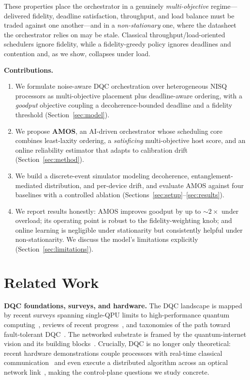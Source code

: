 \documentclass[conference]{IEEEtran}
\begin{document}
These properties place the orchestrator in a genuinely \emph{multi-objective}
regime---delivered fidelity, deadline satisfaction, throughput, and load balance
must be traded against one another---and in a \emph{non-stationary} one, where the
datasheet the orchestrator relies on may be stale. Classical
throughput/load-oriented schedulers ignore fidelity, while a fidelity-greedy
policy ignores deadlines and contention and, as we show, collapses under load.

\noindent\textbf{Contributions.}
\begin{enumerate}
\item We formulate noise-aware DQC orchestration over heterogeneous NISQ
processors as multi-objective placement plus deadline-aware ordering, with a
\emph{goodput} objective coupling a decoherence-bounded deadline and a fidelity
threshold (Section~\ref{sec:model}).
\item We propose \textbf{AMOS}, an AI-driven orchestrator whose scheduling core
combines least-laxity ordering, a \emph{satisficing} multi-objective host score,
and an online reliability estimator that adapts to calibration drift
(Section~\ref{sec:method}).
\item We build a discrete-event simulator modeling decoherence,
entanglement-mediated distribution, and per-device drift, and evaluate AMOS
against four baselines with a controlled ablation
(Sections~\ref{sec:setup}--\ref{sec:results}).
\item We report results honestly: AMOS improves goodput by up to $\sim\!2\times$
under overload; its operating point is robust to the fidelity-weighting knob; and
online learning is negligible under stationarity but consistently helpful under
non-stationarity. We discuss the model's limitations explicitly
(Section~\ref{sec:limitations}).
\end{enumerate}

\section{Related Work}
\textbf{DQC foundations, surveys, and hardware.} The DQC landscape is mapped by
recent surveys spanning single-QPU limits to high-performance quantum
computing~\cite{caleffi2024survey,barral2025review}, reviews of recent
progress~\cite{knorzer2025review}, and taxonomies of the path toward
fault-tolerant DQC~\cite{larasati2025ftdqc}. The networked substrate is framed by
the quantum-internet vision and its building
blocks~\cite{chehimi2022qin,meddeb2025qinternet}. Crucially, DQC is no longer only
theoretical: recent hardware demonstrations couple processors with real-time
classical communication~\cite{carrera2024realtime} and even execute a distributed
algorithm across an optical network link~\cite{main2025optical}, making the
control-plane questions we study concrete.
\end{document}
